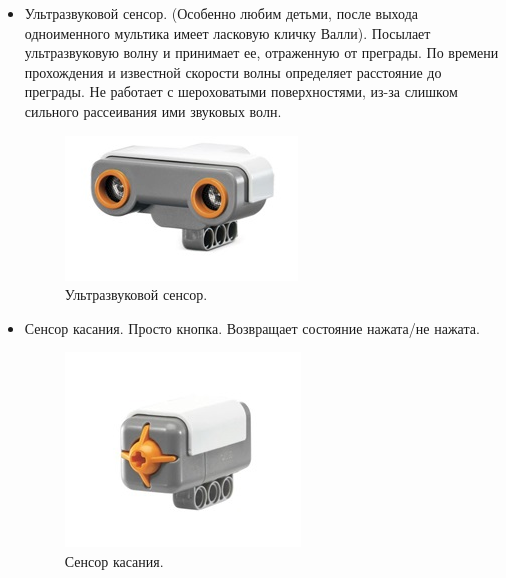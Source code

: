 \begin{itemize}
	\item Ультразвуковой сенсор. (Особенно любим детьми, после выхода одноименного мультика имеет ласковую кличку Валли). Посылает ультразвуковую волну и принимает ее, отраженную от преграды. По времени прохождения и известной скорости волны определяет расстояние до преграды. Не работает с шероховатыми поверхностями, из-за слишком сильного рассеивания ими звуковых волн.
	\begin{figure}[h!]
		\begin{center}
			\includegraphics[width=0.6\linewidth]{chapters/chapter2/images/7}
			\caption{Ультразвуковой сенсор.}
			\label{ris:image2x7}
		\end{center}
	\end{figure}
	
	\item Сенсор касания. Просто кнопка. Возвращает состояние нажата/не нажата.
	\begin{figure}[h!]
		\begin{center}
			\includegraphics[width=0.6\linewidth]{chapters/chapter2/images/8}
			\caption{Сенсор касания.}
			\label{ris:image2x8}
		\end{center}
	\end{figure} 
	

\end{itemize}
